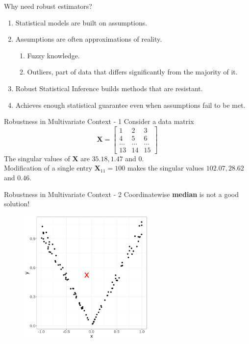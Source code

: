 \documentclass[10pt,xcolor=svgnames]{beamer} %
\newcommand{\bb}[1]{\boldsymbol{#1}}
\begin{document}
\begin{frame}{Why need robust estimators?}
    \begin{enumerate}
        \item Statistical models are built on assumptions.
        \item Assumptions are often approximations of reality.
        \begin{enumerate}
            \item Fuzzy knowledge.
            \item Outliers, part of data that differs significantly from the majority of it.
        \end{enumerate}
        \item Robust Statistical Inference builds methods that are resistant.
        \item Achieves enough statistical guarantee even when assumptions fail to be met.
    \end{enumerate}
\end{frame}

\begin{frame}{Robustness in Multivariate Context - 1}
    Consider a data matrix
    \begin{equation*}
        \bb{X} = \begin{bmatrix}
            1 & 2 & 3\\
            4 & 5 & 6\\
            \dots & \dots & \dots \\
            13 & 14 & 15
        \end{bmatrix}
    \end{equation*}
    \noindent The singular values of $\bb{X}$ are $35.18, 1.47$ and $0$.\\
    \pause 
    Modification of a single entry $\bb{X}_{11} = 100$ makes the singular values $102.07, 28.62$ and $0.46$.
\end{frame}

\begin{frame}{Robustness in Multivariate Context - 2}
    Coordinatewise \textbf{median} is not a good solution!\\
    \begin{figure}
        \centering
        \includegraphics[width = 0.6\textwidth]{v-data.png}
    \end{figure}
\end{frame}
\end{document}
